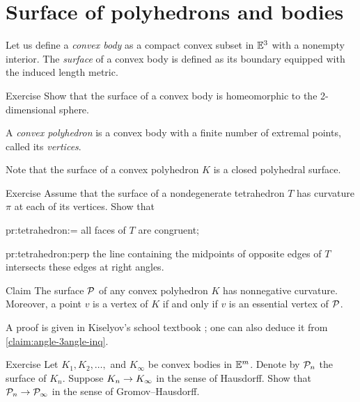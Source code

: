 \section{Surface of polyhedrons and bodies}

Let us define a \emph{convex body} as a compact convex subset in $\mathbb{E}^3$ with a nonempty interior.
The \emph{surface} of a convex body is defined as its boundary equipped with the induced length metric.

\begin{thm}[!]{Exercise}\label{ex:surf-S2}
Show that the surface of a convex body is homeomorphic to the 2-dimensional sphere.
\end{thm}

A \emph{convex polyhedron} is a convex body with a finite number of extremal points, called its \emph{vertices}.

Note that the surface of a convex polyhedron $K$ is a closed polyhedral surface.

\begin{thm}{Exercise}\label{pr:tetrahedron}
Assume that the surface of a nondegenerate tetrahedron $T$ has curvature $\pi$ at each of its vertices.
Show that

\begin{subthm}{pr:tetrahedron:=}
all faces of $T$ are congruent;
\end{subthm}

\begin{subthm}{pr:tetrahedron:perp} the line containing the midpoints of opposite edges of $T$ intersects these edges at right angles.
\end{subthm}

\end{thm}

\begin{thm}{Claim}\label{clm:total-angle}
The surface $\mathcal{P}$ of any convex polyhedron $K$ has nonnegative curvature.
Moreover, a point $v$ is a vertex of $K$ if and only if
$v$ is an essential vertex of $\mathcal{P}$.
\end{thm}

A proof is given in Kiselyov's school textbook \cite[§ 48]{kiselev-stereo-en};
one can also deduce it from \ref{claim:angle-3angle-inq}.

\begin{thm}[!]{Exercise}\label{ex:surface-covergence}
Let $K_1,K_2,\dots,$ and $K_\infty$ be convex bodies in $\mathbb{E}^m$.
Denote by $\mathcal{P}_n$ the surface of $K_n$.
Suppose $K_n\to K_\infty$ in the sense of Hausdorff.
Show that $\mathcal{P}_n\to \mathcal{P}_\infty$ in the sense of Gromov--Hausdorff.
\end{thm}

